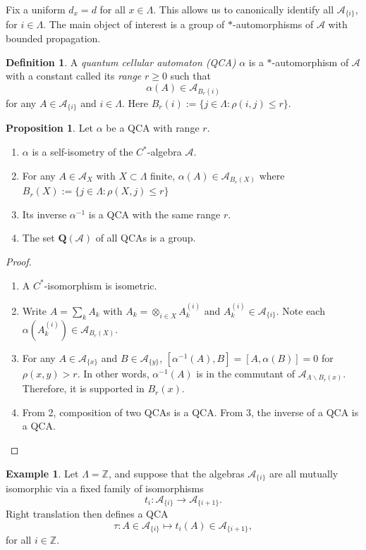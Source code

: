 \documentclass{article}
\theoremstyle{definition}
\newtheorem{defn}[theorem]{Definition}
\newtheorem{exmp}[theorem]{Example}
\newtheorem{prop}[theorem]{Proposition}
\newcommand{\ZZ}{{\mathbb Z}}
\newcommand{\SA}{{\mathscr A}}
\begin{document}
Fix a uniform $d_x=d$ for all $x\in \Lambda$. This allows us to canonically identify all $\SA_{\{i\}}$, for $i\in \Lambda.$ The main object of interest is a group of $*$-automorphisms of $\SA$ with bounded propagation.
\begin{defn}
    A \textit{quantum cellular automaton (QCA)} $\alpha$ is a $*$-automorphism of $\SA$ with a constant called its \textit{range} $r\geq0$ such that 
    $$\alpha(A)\in \SA_{B_r(i)}$$ for any $A\in \SA_{\{i\}}$ and $i\in \Lambda$. Here $B_r(i):=\{j\in \Lambda : \rho(i,j)\leq r\}$.
\end{defn}

\begin{prop}
Let $\alpha$ be a QCA with range $r$.
    \begin{enumerate}
        \item $\alpha$ is a self-isometry of the $C^*$-algebra $\SA$. 
        \item For any $A\in \SA_X$ with $X\subset\Lambda$ finite, $\alpha(A)\in \SA_{B_{r}(X)}$ where $B_{r}(X):=\{j\in \Lambda : \rho(X,j)\leq r\}$
        \item Its inverse $\alpha^{-1}$ is a QCA with the same range $r$. 
        \item The set $\mathbf Q(\SA)$ of all QCAs is a group.
    \end{enumerate}
\end{prop}

\begin{proof}
 \begin{enumerate}
     \item A $C^*$-isomorphism is isometric. 
     \item Write $A=\sum_{k}A_k$ with $A_k=\otimes_{i\in X}A_k^{(i)}$ and $A_k^{(i)}\in\SA_{\{i\}}$. Note each $\alpha(A_k^{(i)})\in \SA_{B_{r}(X)}.$
     \item For any $A\in \SA_{\{x\}}$ and $B\in \SA_{\{y\}}$, $[\alpha^{-1}(A), B]=[A, \alpha(B)]=0$ for $\rho(x,y)>r.$ In other words, $\alpha^{-1}(A)$ is in the commutant of $\SA_{\Lambda \backslash B_r(x)}$. Therefore, it is supported in $B_r(x).$
     \item From 2, composition of two QCAs is a QCA. From 3, the inverse of a QCA is a QCA. 
 \end{enumerate}  
\end{proof}

\begin{exmp}
    Let $\Lambda = \ZZ$, and suppose that the algebras $\SA_{\{i\}}$ are all mutually isomorphic via a fixed family of isomorphisms
\[
t_i \colon \SA_{\{i\}} \to \SA_{\{i+1\}} .
\]
Right translation then defines a QCA
\[
\tau \colon A \in \SA_{\{i\}} \longmapsto t_i(A) \in \SA_{\{i+1\}},
\]
for all $i \in \ZZ$.

\end{exmp}
\end{document}
